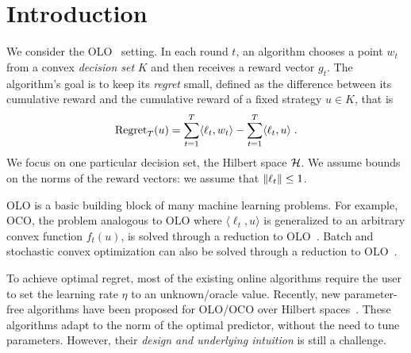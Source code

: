 \section{Introduction}
\label{section:introduction}

We consider the \ac{OLO}~\citep{Cesa-Bianchi-Lugosi-2006, Shalev-Shwartz-2011}
setting. In each round $t$, an algorithm chooses a point $w_t$ from a convex
\emph{decision set} $K$ and then receives a reward vector $g_t$. The algorithm's
goal is to keep its \emph{regret} small, defined as the difference between its
cumulative reward and the cumulative reward of a fixed strategy $u \in K$, that
is
\[
\operatorname{Regret}_T(u) = \sum_{t=1}^T \langle \ell_t, w_t \rangle - \sum_{t=1}^T \langle \ell_t, u \rangle \; .
\]
We focus on one particular decision set, the Hilbert space
$\mathcal{H}$. 
We assume bounds on the norms of the reward vectors: we
assume that $\left\|{\ell_t}\right\| \le 1$.

\ac{OLO} is a basic building block of many machine learning problems. For
example, \ac{OCO}, the problem analogous to \ac{OLO} where $\langle \ell_t, u
\rangle$ is generalized to an arbitrary convex function $f_t(u)$, is solved
through a reduction to \ac{OLO}~\citep{Shalev-Shwartz-2011}.
Batch and stochastic convex optimization
can also be solved through a reduction to \ac{OLO}~\citep{Shalev-Shwartz-2011}.

To achieve optimal regret, most of the existing online algorithms require the user to
set the learning rate $\eta$ to an unknown/oracle value. Recently, new parameter-free
algorithms have been proposed
for \ac{OLO}/\ac{OCO} over Hilbert spaces~\citep{Streeter-McMahan-2012,
Orabona-2013, McMahan-Abernethy-2013, McMahan-Orabona-2014, Orabona-2014}.
These algorithms adapt to the norm of the optimal
predictor, without the need to tune parameters. However, their
\emph{design and underlying intuition} is still a challenge.

